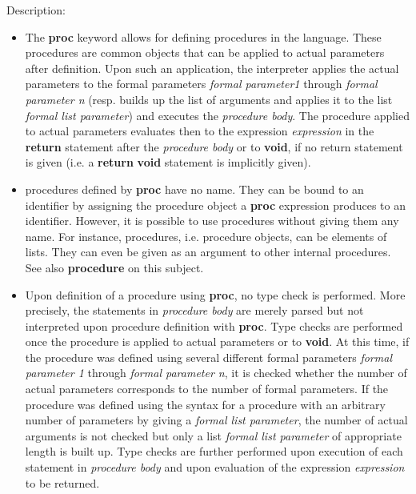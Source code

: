 \noindent Description: \begin{itemize}

\item The \textbf{proc} keyword allows for defining procedures in the \sollya
   language. These procedures are common \sollya objects that can be
   applied to actual parameters after definition. Upon such an
   application, the \sollya interpreter applies the actual parameters to
   the formal parameters \emph{formal parameter1} through \emph{formal parameter n} (resp. builds up the list of arguments and applies it to the list \emph{formal list parameter}) 
   and executes the \emph{procedure body}. The procedure applied to actual
   parameters evaluates then to the expression \emph{expression} in the
   \textbf{return} statement after the \emph{procedure body} or to \textbf{void}, if no return
   statement is given (i.e. a \textbf{return} \textbf{void} statement is implicitly
   given).

\item \sollya procedures defined by \textbf{proc} have no name. They can be bound
   to an identifier by assigning the procedure object a \textbf{proc}
   expression produces to an identifier. However, it is possible to use
   procedures without giving them any name. For instance, \sollya
   procedures, i.e. procedure objects, can be elements of lists. They can
   even be given as an argument to other internal \sollya procedures. See
   also \textbf{procedure} on this subject.

\item Upon definition of a \sollya procedure using \textbf{proc}, no type check
   is performed. More precisely, the statements in \emph{procedure body} are
   merely parsed but not interpreted upon procedure definition with
   \textbf{proc}. Type checks are performed once the procedure is applied to
   actual parameters or to \textbf{void}. At this time, if the procedure was defined using several different formal 
   parameters \emph{formal parameter 1} through \emph{formal parameter n}, it is checked whether the
   number of actual parameters corresponds to the number of formal
   parameters. If the procedure was defined using the syntax for a procedure with 
   an arbitrary number of parameters by giving a \emph{formal list parameter}, the number of actual arguments is not checked but only 
   a list \emph{formal list parameter} of appropriate length is built up. Type checks are further performed upon execution of each
   statement in \emph{procedure body} and upon evaluation of the expression
   \emph{expression} to be returned.
    

\end{itemize}
